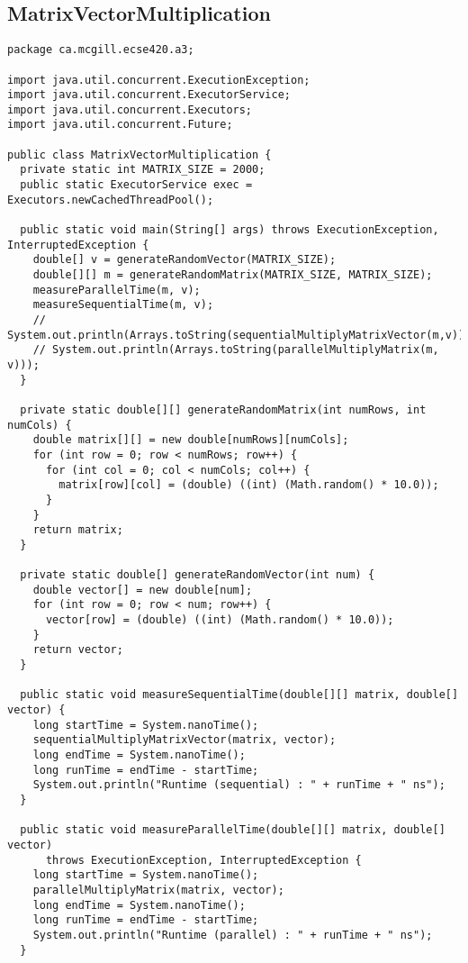 \documentclass[11pt,letterpaper]{exam}
\begin{document}
    \subsection{MatrixVectorMultiplication}
	\begin{lstlisting}
package ca.mcgill.ecse420.a3;

import java.util.concurrent.ExecutionException;
import java.util.concurrent.ExecutorService;
import java.util.concurrent.Executors;
import java.util.concurrent.Future;

public class MatrixVectorMultiplication {
  private static int MATRIX_SIZE = 2000;
  public static ExecutorService exec = Executors.newCachedThreadPool();

  public static void main(String[] args) throws ExecutionException, InterruptedException {
    double[] v = generateRandomVector(MATRIX_SIZE);
    double[][] m = generateRandomMatrix(MATRIX_SIZE, MATRIX_SIZE);
    measureParallelTime(m, v);
    measureSequentialTime(m, v);
    // System.out.println(Arrays.toString(sequentialMultiplyMatrixVector(m,v)));
    // System.out.println(Arrays.toString(parallelMultiplyMatrix(m, v)));
  }

  private static double[][] generateRandomMatrix(int numRows, int numCols) {
    double matrix[][] = new double[numRows][numCols];
    for (int row = 0; row < numRows; row++) {
      for (int col = 0; col < numCols; col++) {
        matrix[row][col] = (double) ((int) (Math.random() * 10.0));
      }
    }
    return matrix;
  }

  private static double[] generateRandomVector(int num) {
    double vector[] = new double[num];
    for (int row = 0; row < num; row++) {
      vector[row] = (double) ((int) (Math.random() * 10.0));
    }
    return vector;
  }

  public static void measureSequentialTime(double[][] matrix, double[] vector) {
    long startTime = System.nanoTime();
    sequentialMultiplyMatrixVector(matrix, vector);
    long endTime = System.nanoTime();
    long runTime = endTime - startTime;
    System.out.println("Runtime (sequential) : " + runTime + " ns");
  }

  public static void measureParallelTime(double[][] matrix, double[] vector)
      throws ExecutionException, InterruptedException {
    long startTime = System.nanoTime();
    parallelMultiplyMatrix(matrix, vector);
    long endTime = System.nanoTime();
    long runTime = endTime - startTime;
    System.out.println("Runtime (parallel) : " + runTime + " ns");
  }


\end{lstlisting}
\end{document}
